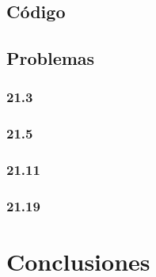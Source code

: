 \documentclass[12pt,oneside,FLEQN]{report}
\begin{document}
{	\section{Código}
		
	\section{Problemas}
		\subsection{21.3}
		\subsection{21.5}
		\subsection{21.11}
		\subsection{21.19}
\chapter{Conclusiones}
}
\end{document}
